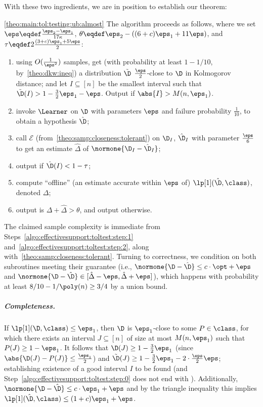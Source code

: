 \noindent With these two ingredients, we are in position to establish our theorem:
\begin{proofof}{\cref{theo:main:tol:testing:ub:almost}}
The algorithm proceeds as follows, where we set $\eps\eqdef\frac{\eps_2-\eps_1}{17\kappa}$, $\theta\eqdef\eps_2 - ((6+c)\eps_1+11\eps)$, and $\tau \eqdef2 \frac{(3+c)\eps_1+5\eps}{2}$:
\begin{enumerate}[(1)]
  \item\label{algo:effectivesupport:toltest:step:0} using $O(\frac{1}{\eps^2})$ samples, get (with probability at least $1-1/10$, by~\cref{theo:dkw:ineq}) a distribution $\tilde{\D}$ $\frac{\eps}{2}$-close to $\D$ in Kolmogorov distance; and let $I\subseteq[n]$ be the smallest interval such that $\tilde{\D}(I) > 1-\frac{3}{2}\eps_1-\eps$. Output \reject if $\abs{I} > M(n,\eps_1)$.
  \item\label{algo:effectivesupport:toltest:step:1} invoke $\Learner$ on $\D$ with parameters $\eps$ and failure probability $\frac{1}{10}$, to obtain a hypothesis $\hat{\D}$;
  \item\label{algo:effectivesupport:toltest:step:2}  call $\mathcal{E}$ (from~\cref{theo:samp:closeness:tolerant}) on $\D_I$, $\hat{\D}_I$ with parameter $\frac{\eps}{6}$ to get an estimate $\hat{\Delta}$ of $\normone{\D_I-\hat{\D}_I}$;
  \item\label{algo:effectivesupport:toltest:step:2.5} output \reject if $\hat{\D}(I) < 1-\tau$; 
  \item\label{algo:effectivesupport:toltest:step:3}  compute ``offline'' (an estimate accurate within $\eps$ of) $\lp[1](\hat{\D},\class)$, denoted $\Delta$;
  \item\label{algo:effectivesupport:toltest:step:4}  output \reject is $\Delta+\hat{\Delta} > \theta$, and output \accept otherwise.
\end{enumerate}
The claimed sample complexity is immediate from Steps~\ref{algo:effectivesupport:toltest:step:1} and~\ref{algo:effectivesupport:toltest:step:2}, along with~\cref{theo:samp:closeness:tolerant}. Turning to correctness, we condition on both subroutines meeting their guarantee (i.e., $\normone{\D-\hat{\D}} \leq c\cdot\opt+\eps$ and $\normone{\D-\hat{\D}} \in [\hat{\Delta} - \eps,\hat{\Delta} + \eps]$), which happens with probability at least $8/10-1/\poly(n)\geq 3/4$ by a union bound. 

\subparagraph{Completeness.} If $\lp[1](\D,\class) \leq \eps_1$, then $\D$ is $\eps_1$-close to some $P\in\class$, for which there exists an interval $J\subseteq[n]$ of size at most $M(n,\eps_1)$ such that $P(J) \geq 1-\eps_1$. It follows that $\D(J) \geq 1-\frac{3}{2}\eps_1$ (since $\abs{\D(J)-P(J)} \leq \frac{\eps_1}{2}$) and $\tilde{\D}(J) \geq 1-\frac{3}{2}\eps_1-2\cdot\frac{\eps}{2}\eps$; establishing existence of a good interval $I$ to be found (and Step~\ref{algo:effectivesupport:toltest:step:0} does not end with \reject). Additionally, $\normone{\D-\hat{\D}} \leq c\cdot\eps_1+\eps$ and by the triangle inequality this implies $\lp[1](\hat{\D},\class) \leq (1+c)\eps_1+\eps$.
  

\end{proofof}

